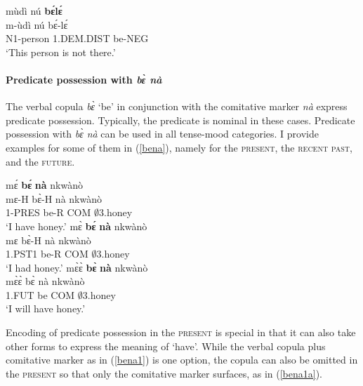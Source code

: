 \begin{exe} 
\ex\label{bele4}
  \glll  mùdì nú {\bfseries bɛ́lɛ́}   \\
        m-ùdì nú bɛ́-lɛ́ \\
         N1-person 1.DEM.DIST be-NEG        \\
    \trans `This person is not there.'
\end{exe}

\paragraph{Predicate possession with {\itshape bɛ̀ nà}}
The verbal copula {\itshape bɛ̀} `be' in conjunction with the comitative marker {\itshape nà} express predicate possession. Typically, the predicate is nominal in these cases. Predicate possession with {\itshape bɛ̀ nà} can be used in all tense-mood categories. I provide examples for some of them in (\ref{bena}), namely for the \textsc{present}, the \textsc{recent past}, and the \textsc{future}.

\begin{exe} 
\ex\label{bena}
\begin{xlist}
\ex\label{bena1}
  \glll  mɛ́ {\bfseries bɛ́} {\bfseries nà} nkwànò  \\
        mɛ-H bɛ̀-H nà nkwànò \\
           1-PRES be-R COM $\emptyset$3.honey      \\
    \trans `I have honey.'
\ex\label{bena2}
  \glll  mɛ̀ {\bfseries bɛ́} {\bfseries nà} nkwànò  \\
        mɛ bɛ̀-H nà nkwànò \\
           1.PST1 be-R COM $\emptyset$3.honey      \\
    \trans `I had honey.'
\ex\label{bena3}
  \glll  mɛ̀ɛ̀ {\bfseries bɛ̀} {\bfseries nà} nkwànò  \\
        mɛ̀ɛ̀ bɛ̀ nà nkwànò \\
           1.FUT be COM $\emptyset$3.honey      \\
    \trans `I will have honey.'
\end{xlist}
\end{exe}

Encoding of predicate possession in the \textsc{present} is special in that it can also take other forms to express the meaning of `have'. While the verbal copula plus comitative marker as in (\ref{bena1}) is one option, the copula can also be omitted in the \textsc{present} so that only the comitative marker surfaces, as in (\ref{bena1a}).


